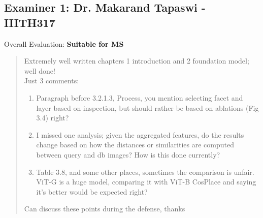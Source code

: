 \subsection{Examiner 1: Dr. Makarand Tapaswi - IIITH317}
Overall Evaluation: {\bf Suitable for MS}
\begin{quote}
    Extremely well written chapters 1 introduction and 2 foundation
    model; well done! \\
    Just 3 comments:
    \begin{enumerate}
        \item Paragraph before 3.2.1.3, Process, you mention selecting
            facet and layer based on inspection, but should rather be
            based on ablations (Fig 3.4) right?
        \item I missed one analysis; given the aggregated features, do
            the results change based on how the distances or
            similarities are computed between query and db images? How
            is this done currently?
        \item Table 3.8, and some other places, sometimes the
            comparison is unfair. ViT-G is a huge model, comparing it
            with ViT-B CosPlace and saying it's better would be
            expected right?
    \end{enumerate}
    Can discuss these points during the defense, thanks
\end{quote}

